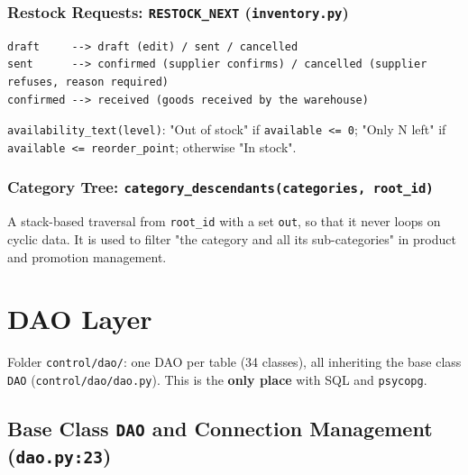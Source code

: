 \hypertarget{restock-requests-restock_next-inventory.py}{%
\subsubsection{\texorpdfstring{Restock Requests: \texttt{RESTOCK\_\allowbreak{}NEXT}
(\texttt{inventory.\allowbreak{}py})}{Restock Requests: RESTOCK\_NEXT (inventory.py)}}\label{restock-requests-restock_next-inventory.py}}

\begin{lstlisting}[numbers=none]
draft     --> draft (edit) / sent / cancelled
sent      --> confirmed (supplier confirms) / cancelled (supplier refuses, reason required)
confirmed --> received (goods received by the warehouse)
\end{lstlisting}

\texttt{availability\_\allowbreak{}text(\allowbreak{}level)}: "Out of stock" if
\texttt{available \textless{}=\allowbreak{} 0}; "Only N left" if
\texttt{available \textless{}=\allowbreak{} reorder\_\allowbreak{}point}; otherwise "In stock".

\hypertarget{category-tree-category_descendantscategories-root_id}{%
\subsubsection{\texorpdfstring{Category Tree:
\texttt{category\_\allowbreak{}descendants(\allowbreak{}categories,\allowbreak{} root\_\allowbreak{}id)}}{Category Tree: category\_descendants(categories, root\_id)}}\label{category-tree-category_descendantscategories-root_id}}

A stack-based traversal from \texttt{root\_\allowbreak{}id} with a set \texttt{out},
so that it never loops on cyclic data. It is used to filter "the
category and all its sub-categories" in product and promotion
management.

\hypertarget{dao-layer}{%
\section{DAO Layer}\label{dao-layer}}

Folder \texttt{control/\allowbreak{}dao/\allowbreak{}}: one DAO per table (34 classes), all
inheriting the base class \texttt{DAO} (\texttt{control/\allowbreak{}dao/\allowbreak{}dao.\allowbreak{}py}).
This is the \textbf{only place} with SQL and \texttt{psycopg}.

\hypertarget{base-class-dao-and-connection-management-dao.py23}{%
\subsection{\texorpdfstring{Base Class \texttt{DAO} and Connection
Management
(\texttt{dao.\allowbreak{}py:23})}{Base Class DAO and Connection Management (dao.py:23)}}\label{base-class-dao-and-connection-management-dao.py23}}

